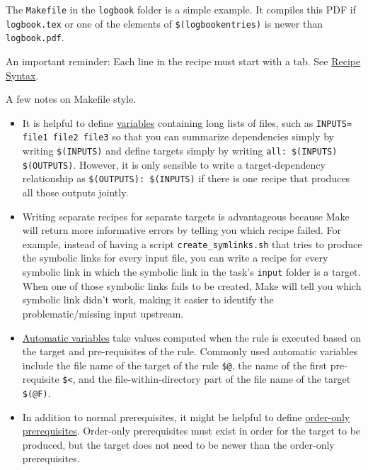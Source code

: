 The \texttt{Makefile} in the \texttt{logbook} folder is a simple example.
It compiles this PDF if \texttt{logbook.tex} or one of the elements of \texttt{\$(logbookentries)} is newer than \texttt{logbook.pdf}.

An important reminder: Each line in the recipe must start with a tab.
See \href{https://www.gnu.org/software/make/manual/html_node/Recipe-Syntax.html}{Recipe Syntax}.

A few notes on Makefile style.
\begin{itemize}
\item It is helpful to define \href{https://www.gnu.org/software/make/manual/html_node/Variables-Simplify.html#Variables-Simplify}{variables} containing long lists of files, such as \texttt{INPUTS= file1 file2 file3}
so that you can summarize dependencies simply by writing \texttt{\$(INPUTS)}
and define targets simply by writing \texttt{all: \$(INPUTS) \$(OUTPUTS)}.
However, it is only sensible to write a target-dependency relationship as
\texttt{\$(OUTPUTS): \$(INPUTS)}
if there is one recipe that produces all those outputs jointly.
\item Writing separate recipes for separate targets is advantageous because Make will return more informative errors by telling you which recipe failed.
For example, instead of having a script \texttt{create\_symlinks.sh} that tries to produce the symbolic links for every input file,
you can write a recipe for every symbolic link in which the symbolic link in the task's \texttt{input} folder is a target.
When one of those symbolic links fails to be created, Make will tell you which symbolic link didn't work, making it easier to identify the problematic/missing input upstream.
\item \href{https://www.gnu.org/software/make/manual/html_node/Automatic-Variables.html}{Automatic variables} take values computed when the rule is executed based on the target and pre-requisites of the rule.
Commonly used automatic variables include
the file name of the target of the rule \texttt{\$@},
the name of the first pre-requisite \texttt{\$<},
and
the file-within-directory part of the file name of the target \texttt{\$(@F)}.
\item In addition to normal prerequisites, it might be helpful to define \href{https://www.gnu.org/software/make/manual/html_node/Prerequisite-Types.html}{order-only prerequisites}.
Order-only prerequisites must exist in order for the target to be produced, but the target does not need to be newer than the order-only prerequisites.

\end{itemize}
